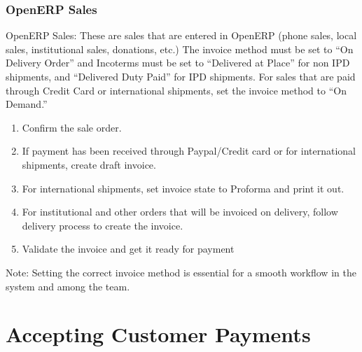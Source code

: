 \subsubsection{OpenERP Sales}
OpenERP Sales: These are sales that are entered in OpenERP (phone sales, local sales, institutional sales, donations, etc.) The invoice method must be set to “On Delivery Order” and Incoterms must be set to “Delivered at Place” for non IPD shipments, and “Delivered Duty Paid” for IPD shipments. For sales that are paid through Credit Card or international shipments, set the invoice method to “On Demand.”
\begin{enumerate}
\item Confirm the sale order.
\item If payment has been received through Paypal/Credit card or for international shipments, create draft invoice.
\item For international shipments, set invoice state to Proforma and print it out.
\item For institutional and other orders that will be invoiced on delivery, follow delivery process to create the invoice.
\item Validate the invoice and get it ready for payment
\end{enumerate}
Note: Setting the correct invoice method is essential for a smooth workflow in the system and among the team.

\section{Accepting Customer Payments}

